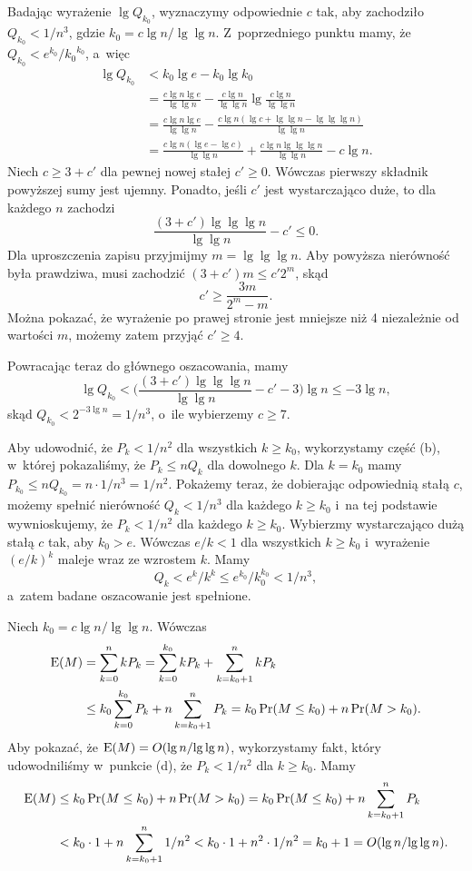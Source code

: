 \subproblem %

\noindent Badając wyrażenie $\lg Q_{k_0}$, wyznaczymy odpowiednie $c$ tak, aby zachodziło $Q_{k_0}<1/n^3$, gdzie $k_0=c\lg n/\!\lg\lg n$.
Z~poprzedniego punktu mamy, że $Q_{k_0}<e^{k_0}\!/{k_0}^{k_0}$, a~więc
\begin{align*}
	\lg Q_{k_0} &< k_0\lg e-k_0\lg k_0 \\
	&= \frac{c\lg n\lg e}{\lg\lg n}-\frac{c\lg n}{\lg\lg n}\lg\frac{c\lg n}{\lg\lg n} \\[1mm]
	&= \frac{c\lg n\lg e}{\lg\lg n}-\frac{c\lg n(\lg c+\lg\lg n-\lg\lg\lg n)}{\lg\lg n} \\[1mm]
	&= \frac{c\lg n(\lg e-\lg c)}{\lg\lg n}+\frac{c\lg n\lg\lg\lg n}{\lg\lg n}-c\lg n.
\end{align*}
Niech $c\ge3+c'$ dla pewnej nowej stałej $c'\ge0$.
Wówczas pierwszy składnik powyższej sumy jest ujemny.
Ponadto, jeśli $c'$ jest wystarczająco duże, to dla każdego $n$ zachodzi
\[
	\frac{(3+c')\lg\lg\lg n}{\lg\lg n}-c' \le 0.
\]
Dla uproszczenia zapisu przyjmijmy $m=\lg\lg\lg n$.
Aby powyższa nierówność była prawdziwa, musi zachodzić $(3+c')m\le c'2^m$, skąd
\[
	c' \ge \frac{3m}{2^m-m}.
\]
Można pokazać, że wyrażenie po prawej stronie jest mniejsze niż 4 niezależnie od wartości $m$, możemy zatem przyjąć $c'\ge4$.

Powracając teraz do głównego oszacowania, mamy
\[
	\lg Q_{k_0} < \biggl(\frac{(3+c')\lg\lg\lg n}{\lg\lg n}-c'-3\biggr)\lg n \le -3\lg n,
\]
skąd $Q_{k_0}<2^{-3\lg n}=1/n^3$, o~ile wybierzemy $c\ge7$.

Aby udowodnić, że $P_k<1/n^2$ dla wszystkich $k\ge k_0$, wykorzystamy część (b), w~której pokazaliśmy, że $P_k\le nQ_k$ dla dowolnego $k$.
Dla $k=k_0$ mamy $P_{k_0}\le nQ_{k_0}=n\cdot1/n^3=1/n^2$.
Pokażemy teraz, że dobierając odpowiednią stałą $c$, możemy spełnić nierówność $Q_k<1/n^3$ dla każdego $k\ge k_0$ i~na tej podstawie wywnioskujemy, że $P_k<1/n^2$ dla każdego $k\ge k_0$.
Wybierzmy wystarczająco dużą stałą $c$ tak, aby $k_0>e$.
Wówczas $e/k<1$ dla wszystkich $k\ge k_0$ i~wyrażenie $(e/k)^k$ maleje wraz ze wzrostem $k$.
Mamy
\[
	Q_k < e^k\!/k^k \le e^{k_0}\!/k_0^{k_0} < 1/n^3,
\]
a~zatem badane oszacowanie jest spełnione.

\subproblem %
Niech $k_0=c\lg n/\!\lg\lg n$.
Wówczas
\begin{align*}
	\operatorname{E}(M) &= \sum_{k=0}^nkP_k = \sum_{k=0}^{k_0}kP_k+\sum_{k=k_0+1}^nkP_k \\
	&\le k_0\sum_{k=0}^{k_0}P_k+n\sum_{k=k_0+1}^nP_k = k_0\Pr(M\le k_0)+n\Pr(M>k_0).
\end{align*}
Aby pokazać, że $\operatorname{E}(M)=O(\lg n/\!\lg\lg n)$, wykorzystamy fakt, który udowodniliśmy w~punkcie (d), że $P_k<1/n^2$ dla $k\ge k_0$.
Mamy
\begin{align*}
	\operatorname{E}(M) &\le k_0\Pr(M\le k_0)+n\Pr(M>k_0) = k_0\Pr(M\le k_0)+n\sum_{k=k_0+1}^nP_k \\
	&< k_0\cdot1+n\sum_{k=k_0+1}^n1/n^2 < k_0\cdot1+n^2\cdot1/n^2 = k_0+1 = O(\lg n/\!\lg\lg n).
\end{align*}

